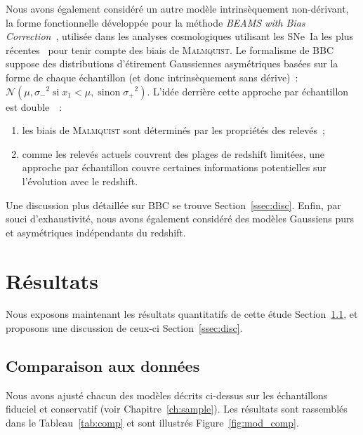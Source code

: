 \documentclass[../main/main.tex]{subfiles}
\begin{document}
Nous avons également considéré un autre modèle intrinsèquement non-dérivant, la
forme fonctionnelle développée pour la méthode \textit{BEAMS with Bias
Correction}~\citep[BBC,][]{scolnic2016, kessler2017}, utilisée dans les analyses
cosmologiques utilisant les SNe~Ia les plus récentes~\citep[par
exemple][]{scolnic2018, abbott2019, riess2016, riess2019} pour tenir compte des
biais de \textsc{Malmquist}. Le formalisme de BBC suppose des distributions
d'étirement Gaussiennes asymétriques basées sur la forme de chaque échantillon
(et donc intrinsèquement sans dérive)~: $\mathcal{N}\left(\mu, \sigma_-{}^2\;
\text{si} \;x_1<\mu,\; \text{sinon} \;\sigma_+{}^2\right)$. L'idée derrière
cette approche par échantillon est double~\citep{scolnic2016, scolnic2018}~:
\begin{enumerate}
    \item les biais de \textsc{Malmquist} sont déterminés par les propriétés des
        relevés~;
    \item comme les relevés actuels couvrent des plages de redshift limitées,
        une approche par échantillon couvre certaines informations potentielles
        sur l'évolution avec le redshift.
\end{enumerate}
Une discussion plus détaillée sur BBC se trouve Section~\ref{ssec:disc}. Enfin,
par souci d'exhaustivité, nous avons également considéré des modèles Gaussiens
purs et asymétriques indépendants du redshift.

\section{Résultats}\label{sec:xres}

Nous exposons maintenant les résultats quantitatifs de cette étude
Section~\ref{ssec:xcomp}, et proposons une discussion de ceux-ci
Section~\ref{ssec:disc}.

\subsection{Comparaison aux données}\label{ssec:xcomp}
Nous avons ajusté chacun des modèles décrits ci-dessus sur les échantillons
fiduciel et conservatif (voir Chapitre~\ref{ch:sample}). Les résultats sont
rassemblés dans le Tableau~\ref{tab:comp} et sont illustrés
Figure~\ref{fig:mod_comp}.
\end{document}
